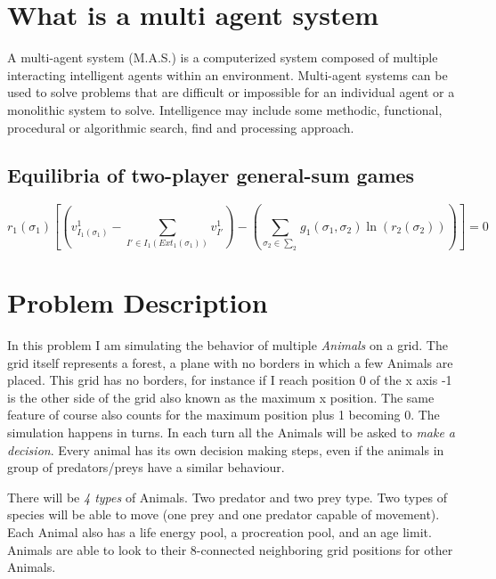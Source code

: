 \documentclass[11pt]{article}
\begin{document}


\section*{What is a multi agent system}
A multi-agent system (M.A.S.) is a computerized system composed of multiple interacting intelligent agents within an environment. Multi-agent systems can be used to solve problems that are difficult or impossible for an individual agent or a monolithic system to solve. Intelligence may include some methodic, functional, procedural or algorithmic search, find and processing approach.\cite{cit:wikiInfo}
\subsection*{Equilibria of two-player general-sum games}
\[
r_{1}(\sigma_{1})\left[\left(v^{1}_{I_{1}(\sigma_{1})}-\sum\limits_{I'\in I_{1}(Ext_{1}(\sigma_{1}))}v^{1}_{I'}\right)
-\left(\sum\limits_{\sigma_{2}\in \sum_{2}}g_{1}(\sigma_{1}, \sigma_{2})\ln(r_{2}(\sigma_{2}))\right)\right]=0
\]
\cite{cit:bookFormula}

\section*{Problem Description}

In this problem I am simulating the behavior of multiple \emph{Animals} on a grid\cite{cit:wikiInfo}. The grid itself represents a forest, a plane with no borders in which a few Animals are placed. This grid has no borders, for instance if I reach position 0 of the x axis -1 is the other side of the grid also known as the maximum x position. The same feature of course also counts for the maximum position plus 1 becoming 0. The simulation happens in turns. In each turn all the Animals will be asked to \emph{make a decision}. Every animal has its own decision making steps, even if the animals in group of predators/preys have a similar behaviour.

There will be \emph{4 types} of Animals. Two predator and two prey type. Two types of species will be able to move (one prey and one predator capable of movement). Each Animal also has a life energy pool, a procreation pool, and an age limit. Animals are able to look to their 8-connected neighboring grid positions for other Animals.
\end{document}
